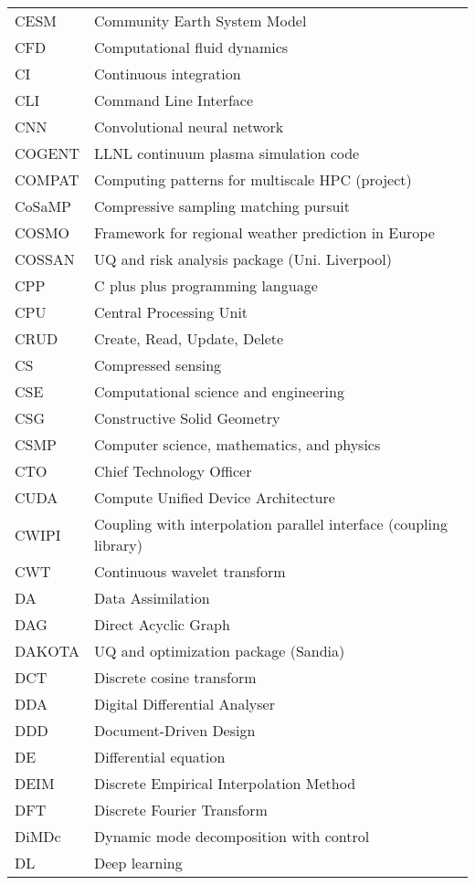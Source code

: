 \begin{longtable}{|p{4.0cm}|p{12.0cm}|}
CESM & Community Earth System Model\\
CFD  & Computational fluid dynamics \\
CI & Continuous integration\\
CLI & Command Line Interface \\
CNN  & Convolutional neural network \\
COGENT & LLNL continuum plasma simulation code\\
COMPAT & Computing patterns for multiscale HPC (project)\\
CoSaMP  & Compressive sampling matching pursuit \\
COSMO & Framework for regional weather prediction in Europe \\
COSSAN & UQ and risk analysis package (Uni. Liverpool)\\
CPP & C plus plus programming language\\
CPU & Central Processing Unit \\
CRUD & Create, Read, Update, Delete \\
CS & Compressed sensing \\
CSE & Computational science and engineering\\
CSG & Constructive Solid Geometry \\
CSMP & Computer science, mathematics, and physics\\
CTO & Chief Technology Officer \\
CUDA & Compute Unified Device Architecture \\
CWIPI & Coupling with interpolation parallel interface (coupling library)\\
CWT  & Continuous wavelet transform \\
DA & Data Assimilation\\
DAG & Direct Acyclic Graph \\
DAKOTA & UQ and optimization package (Sandia)\\
DCT  & Discrete cosine transform \\
DDA & Digital Differential Analyser\\
DDD & Document-Driven Design \\
DE & Differential equation \\
DEIM & Discrete Empirical Interpolation Method \\
DFT & Discrete Fourier Transform \\
DiMDc  & Dynamic mode decomposition with control \\
DL  & Deep learning \\

\end{longtable}
